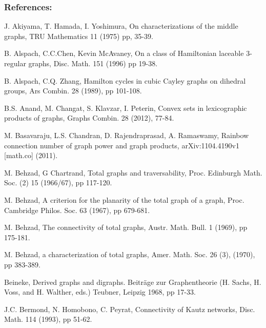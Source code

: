 \documentclass[10pt]{beamer}
\begin{document}
\begin{frame}[allowframebreaks]
  \frametitle{References:}
  \begin{enumerate}
        J. Akiyama, T. Hamada, I. Yoshimura, On characterizations of the middle graphs, TRU Mathematics 11 (1975) pp, 35-39.

        B. Alspach, C.C.Chen, Kevin McAvaney, On a class of Hamiltonian laceable 3-regular graphs, Disc. Math. 151 (1996) pp 19-38.

        B. Alspach, C.Q. Zhang, Hamilton cycles in cubic Cayley graphs on dihedral groups, Ars Combin. 28 (1989), pp 101-108.

        B.S. Anand, M. Changat, S. Klavzar, I. Peterin, Convex sets in lexicographic products of graphs, Graphs Combin. 28 (2012), 77-84.

        M. Basavaraju, L.S. Chandran, D. Rajendraprasad, A. Ramaswamy, Rainbow connection number of graph power and graph products,  arXiv:1104.4190v1 [math.co] (2011).

        M. Behzad, G Chartrand, Total graphs and traversability, Proc. Edinburgh Math. Soc. (2) 15 (1966/67), pp 117-120.

        M. Behzad, A criterion for the planarity of the total graph of a graph, Proc. Cambridge Philos. Soc. 63 (1967), pp 679-681.

        M. Behzad, The connectivity of total graphs, Austr. Math. Bull. 1 (1969), pp 175-181.

        M. Behzad, a characterization of total graphs, Amer. Math. Soc. 26 (3), (1970), pp 383-389.

        Beineke, Derived graphs and digraphs. Beiträge zur Graphentheorie (H. Sachs, H. Voss, and H. Walther, eds.) Teubner, Leipzig 1968, pp 17-33.

        J.C. Bermond, N. Homobono, C. Peyrat, Connectivity of Kautz networks, Disc. Math. 114 (1993), pp 51-62.
    \end{enumerate}
\end{frame}
\end{document}
